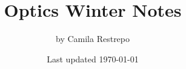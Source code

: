 \documentclass{notes}
\title{\bfseries Optics Winter Notes}
\author{by Camila Restrepo}
\date{Last updated \today}
\begin{document}
\maketitle
\toccontents
\frontpagewarning



\end{document}
